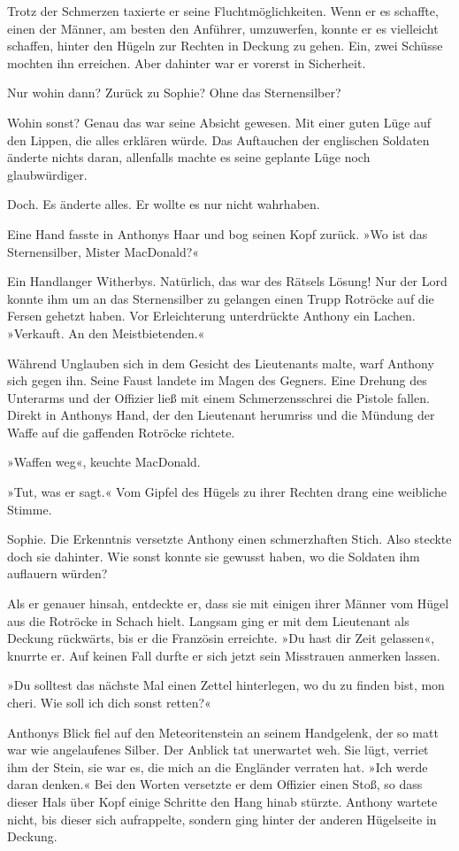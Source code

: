 Trotz der Schmerzen taxierte er seine Fluchtmöglichkeiten. Wenn er
es schaffte, einen der Männer, am besten den Anführer, umzuwerfen,
konnte er es vielleicht schaffen, hinter den Hügeln zur Rechten in
Deckung zu gehen. Ein, zwei Schüsse mochten ihn erreichen. Aber
dahinter war er vorerst in Sicherheit.

Nur wohin dann? Zurück zu Sophie? Ohne das Sternensilber?

Wohin sonst? Genau das war seine Absicht gewesen. Mit einer guten
Lüge auf den Lippen, die alles erklären würde. Das Auftauchen der
englischen Soldaten änderte nichts daran, allenfalls machte es
seine geplante Lüge noch glaubwürdiger.

Doch. Es änderte alles. Er wollte es nur nicht wahrhaben.

Eine Hand fasste in Anthonys Haar und bog seinen Kopf zurück. »Wo
ist das Sternensilber, Mister MacDonald?«

Ein Handlanger Witherbys. Natürlich, das war des Rätsels Lösung!
Nur der Lord konnte ihm um an das Sternensilber zu gelangen einen
Trupp Rotröcke auf die Fersen gehetzt haben. Vor Erleichterung
unterdrückte Anthony ein Lachen. »Verkauft. An den
Meistbietenden.«

Während Unglauben sich in dem Gesicht des Lieutenants malte, warf
Anthony sich gegen ihn. Seine Faust landete im Magen des Gegners.
Eine Drehung des Unterarms und der Offizier ließ mit einem
Schmerzensschrei die Pistole fallen. Direkt in Anthonys Hand, der
den Lieutenant herumriss und die Mündung der Waffe auf die
gaffenden Rotröcke richtete.

»Waffen weg«, keuchte MacDonald.

»Tut, was er sagt.« Vom Gipfel des Hügels zu ihrer Rechten drang
eine weibliche Stimme.

Sophie. Die Erkenntnis versetzte Anthony einen schmerzhaften Stich.
Also steckte doch sie dahinter. Wie sonst konnte sie gewusst haben,
wo die Soldaten ihm auflauern würden?

Als er genauer hinsah, entdeckte er, dass sie mit einigen ihrer
Männer vom Hügel aus die Rotröcke in Schach hielt. Langsam ging er
mit dem Lieutenant als Deckung rückwärts, bis er die Französin
erreichte. »Du hast dir Zeit gelassen«, knurrte er. Auf keinen Fall
durfte er sich jetzt sein Misstrauen anmerken lassen.

»Du solltest das nächste Mal einen Zettel hinterlegen, wo du zu
finden bist, mon cheri. Wie soll ich dich sonst retten?«

Anthonys Blick fiel auf den Meteoritenstein an seinem Handgelenk,
der so matt war wie angelaufenes Silber. Der Anblick tat unerwartet
weh. Sie lügt, verriet ihm der Stein, sie war es, die mich an die
Engländer verraten hat. »Ich werde daran denken.« Bei den Worten
versetzte er dem Offizier einen Stoß, so dass dieser Hals über Kopf
einige Schritte den Hang hinab stürzte. Anthony wartete nicht, bis
dieser sich aufrappelte, sondern ging hinter der anderen Hügelseite
in Deckung.

